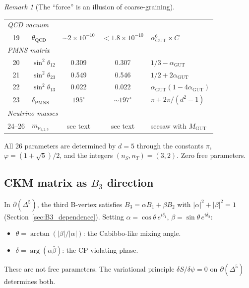 \documentclass[12pt]{article}
\theoremstyle{remark}
\newtheorem{remark}[theorem]{Remark}
\theoremstyle{definition}
\newcommand{\agut}{\alpha_{\mathrm{GUT}}}
\begin{document}
\begin{remark}[The ``force'' is an illusion of coarse-graining]
\begin{center}
\begin{tabular}{clccl}
\hline
\multicolumn{5}{l}{\emph{QCD vacuum}} \\
19 & $\theta_\text{QCD}$ & $\sim 2\!\times\! 10^{-10}$ & $< 1.8\!\times\! 10^{-10}$ & $\alpha_\text{GUT}^6 \times C$ \\
\hline
\multicolumn{5}{l}{\emph{PMNS matrix}} \\
20 & $\sin^2\theta_{12}$ & 0.309 & 0.307 & $1/3 - \alpha_\text{GUT}$ \\
21 & $\sin^2\theta_{23}$ & 0.549 & 0.546 & $1/2 + 2\alpha_\text{GUT}$ \\
22 & $\sin^2\theta_{13}$ & 0.022 & 0.022 & $\agut(1-4\agut)$ \\
23 & $\delta_\text{PMNS}$ & $195^\circ$ & $\sim 197^\circ$ & $\pi + 2\pi/(d^2\!-\!1)$ \\
\hline
\multicolumn{5}{l}{\emph{Neutrino masses}} \\
24--26 & $m_{\nu_{1,2,3}}$ & see text & see text & seesaw with $M_\text{GUT}$ \\
\hline
\end{tabular}
\end{center}

\medskip
\noindent All 26 parameters are determined by $d = 5$ through the constants $\pi$, $\varphi = (1+\sqrt{5})/2$, and the integers $(n_S, n_T) = (3, 2)$. Zero free parameters.

\subsection{CKM matrix as $B_3$ direction}
\label{sec:ckm_geometry}

In $\partial(\Delta^5)$, the third B-vertex satisfies $B_3 = \alpha B_1 + \beta B_2$ with $|\alpha|^2 + |\beta|^2 = 1$ (Section~\ref{sec:B3_dependence}).  Setting $\alpha = \cos\theta\,e^{i\delta_1}$, $\beta = \sin\theta\,e^{i\delta_2}$:

\begin{itemize}
\item $\theta = \arctan(|\beta|/|\alpha|)$: the Cabibbo-like mixing angle.
\item $\delta = \arg(\alpha\bar\beta)$: the CP-violating phase.
\end{itemize}

These are not free parameters.  The variational principle $\delta S/\delta\psi = 0$ on $\partial(\Delta^5)$ determines both.


\end{remark}
\end{document}
